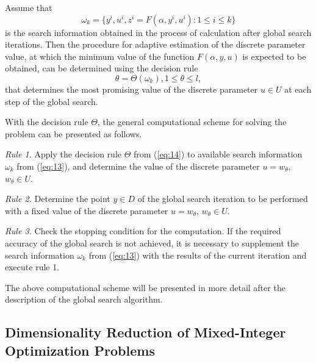 \documentclass{svproc}
\begin{document}
Assume that 
\begin{equation}\label{eq:13}
 \omega_k=\{ y^i,u^i,z^i=F(\alpha,y^i,u^i ): 1\leq i\leq k \}
\end{equation}
is the search information obtained in the process of calculation after global search iterations. Then the procedure for adaptive estimation of the discrete parameter value, at which the minimum value  of the function $F(\alpha,y,u)$ is expected to be obtained, can be determined using the decision rule
\begin{equation}\label{eq:14}
	\theta =\Theta(\omega_k ),1 \leq \theta \leq l, 
\end{equation}
 that determines the most promising value of the discrete parameter $u \in U$ at each step of the global search.

With the decision rule $\Theta$, the general computational scheme for solving the problem can be presented as follows.

\textit{Rule 1.} Apply the decision rule $\Theta$ from (\ref{eq:14}) to available search information $\omega_k$ from (\ref{eq:13}),  and determine the value of the discrete parameter $u=w_\theta$, $w_\theta \in U$.

\textit{Rule 2.} Determine the point $y \in D$ of the global search iteration to be performed with a fixed value of the discrete parameter $u=w_\theta$, $w_\theta \in U$.
			
\textit{Rule 3.} Check the stopping condition for the computation. If the required accuracy of the global search is not achieved, it is necessary to supplement the search information $\omega_k$ from (\ref{eq:13}) with the results of the current iteration and execute rule 1.

   The above computational scheme will be presented in more detail after the description of the global search algorithm. 



\subsection{Dimensionality Reduction of Mixed-Integer Optimization Problems} \label{subsec:32}
\end{document}
